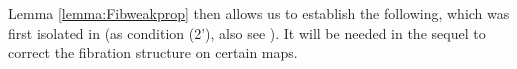 \documentclass[12pt]{article}
\newcommand{\ra}{\ensuremath{\rightarrow}}
\renewcommand{\to}{\ensuremath{\rightarrow}}
\newcommand{\U}{\ensuremath{\mathcal{U}}}
\newcommand{\UU}{\ensuremath{\,\dot{\mathcal{U}}}}
\newcommand{\V}{\ensuremath{\mathcal{V}}}
\newcommand{\VV}{\ensuremath{\dot{\mathcal{V}}}}
\newcommand{\Fib}{\ensuremath{\mathsf{Fib}}}
\newcommand{\TFib}{\ensuremath{\mathsf{TFib}}}
\newcommand{\TTFib}{\ensuremath{\dot{\mathsf{TFib}}}}
\theoremstyle{remark}
\theoremstyle{definition}
\begin{document}
%
\noindent Lemma \ref{lemma:Fibweakprop}  then allows us to establish the following, which was first isolated in \cite{Shu:UAERP}  (as condition (2'), also see \cite{Shu:15}). It will be needed in the sequel to correct the fibration structure on certain maps.
\end{document}
